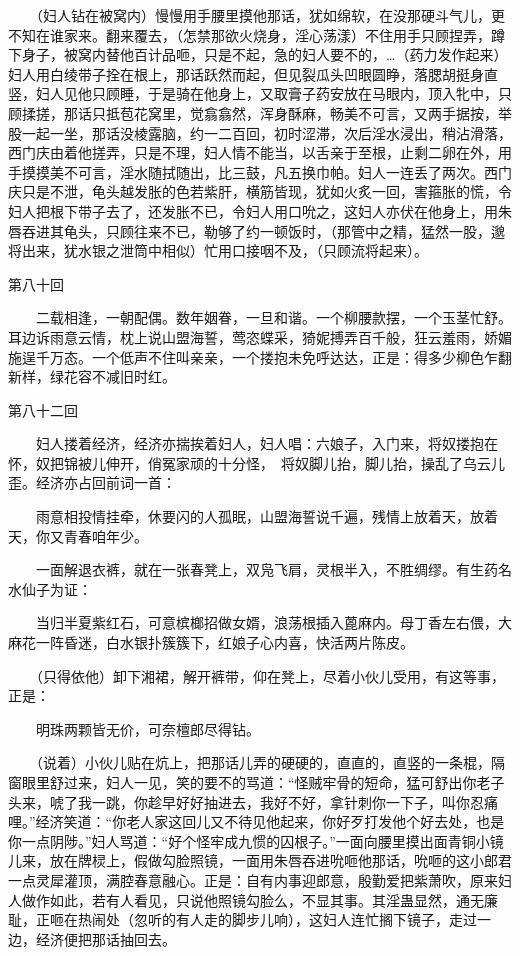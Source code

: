 　　（妇人钻在被窝内）慢慢用手腰里摸他那话，犹如绵软，在没那硬斗气儿，更不知在谁家来。翻来覆去，（怎禁那欲火烧身，淫心荡漾）不住用手只顾捏弄，蹲下身子，被窝内替他百计品咂，只是不起，急的妇人要不的，…（药力发作起来）妇人用白绫带子拴在根上，那话跃然而起，但见裂瓜头凹眼圆睁，落腮胡挺身直竖，妇人见他只顾睡，于是骑在他身上，又取膏子药安放在马眼内，顶入牝中，只顾揉搓，那话只抵苞花窝里，觉翕翕然，浑身酥麻，畅美不可言，又两手据按，举股一起一坐，那话没棱露脑，约一二百回，初时涩滞，次后淫水浸出，稍沾滑落，西门庆由着他搓弄，只是不理，妇人情不能当，以舌亲于至根，止剩二卵在外，用手摸摸美不可言，淫水随拭随出，比三鼓，凡五换巾帕。妇人一连丢了两次。西门庆只是不泄，龟头越发胀的色若紫肝，横筋皆现，犹如火炙一回，害箍胀的慌，令妇人把根下带子去了，还发胀不已，令妇人用口吮之，这妇人亦伏在他身上，用朱唇吞进其龟头，只顾往来不已，勒够了约一顿饭时，（那管中之精，猛然一股，邈将出来，犹水银之泄筒中相似）忙用口接咽不及，（只顾流将起来）。


第八十回

　　二载相逢，一朝配偶。数年姻眷，一旦和谐。一个柳腰款摆，一个玉茎忙舒。耳边诉雨意云情，枕上说山盟海誓，莺恣蝶采，猗妮搏弄百千般，狂云羞雨，娇媚施逞千万态。一个低声不住叫亲亲，一个搂抱未免呼达达，正是：得多少柳色乍翻新样，绿花容不减旧时红。


第八十二回

　　妇人搂着经济，经济亦揣挨着妇人，妇人唱：六娘子，入门来，将奴搂抱在怀，奴把锦被儿伸开，俏冤家顽的十分怪，　将奴脚儿抬，脚儿抬，操乱了乌云儿歪。经济亦占回前词一首：

　　雨意相投情挂牵，休要闪的人孤眠，山盟海誓说千遍，残情上放着天，放着天，你又青春咱年少。

　　一面解退衣裤，就在一张春凳上，双凫飞肩，灵根半入，不胜绸缪。有生药名水仙子为证：

　　当归半夏紫红石，可意槟榔招做女婿，浪荡根插入蓖麻内。母丁香左右偎，大麻花一阵昏迷，白水银扑簇簇下，红娘子心内喜，快活两片陈皮。

　　（只得依他）卸下湘裙，解开裤带，仰在凳上，尽着小伙儿受用，有这等事，正是：

　　明珠两颗皆无价，可奈檀郎尽得钻。


　　（说着）小伙儿贴在炕上，把那话儿弄的硬硬的，直直的，直竖的一条棍，隔窗眼里舒过来，妇人一见，笑的要不的骂道：“怪贼牢骨的短命，猛可舒出你老子头来，唬了我一跳，你趁早好好抽进去，我好不好，拿针刺你一下子，叫你忍痛哩。”经济笑道：“你老人家这回儿又不待见他起来，你好歹打发他个好去处，也是你一点阴陟。”妇人骂道：“好个怪牢成九惯的囚根子。”一面向腰里摸出面青铜小镜儿来，放在牌棂上，假做勾脸照镜，一面用朱唇吞进吮咂他那话，吮咂的这小郎君一点灵犀灌顶，满腔春意融心。正是：自有内事迎郎意，殷勤爱把紫萧吹，原来妇人做作如此，若有人看见，只说他照镜勾脸么，不显其事。其淫蛊显然，通无廉耻，正咂在热闹处（忽听的有人走的脚步儿响），这妇人连忙搁下镜子，走过一边，经济便把那话抽回去。


